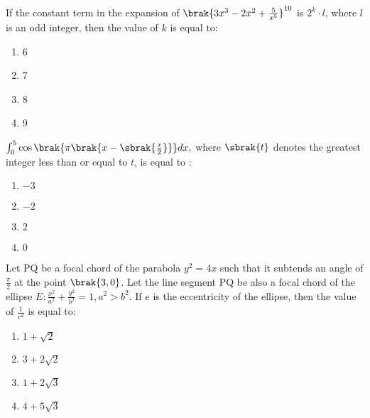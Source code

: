 \iffalse
\title{Assignment}
\author{K.AKSHAY TEJA}
\section{mcq-single}
\fi 
\item If the constant term in the expansion of $\brak{ 3x^3 - 2x^2 + \frac{5}{x^5} }^{10}$ is $2^k \cdot l$, where $l$ is an odd integer, then the value of $k$ is equal to: \hfill {}
\begin{multicols}{4}    
\begin{enumerate}
    \item 6
    \item 7
    \item 8
    \item 9
\end{enumerate}
\end{multicols}

\item $\int_{0}^{5} \cos \brak{\pi \brak{ x - \sbrak{ \frac{x}{2}} } } dx,$ where $\sbrak{ t} $ denotes the greatest integer less than or equal to $t$, is equal to :\hfill {}

\begin{multicols}{4}    
\begin{enumerate}
    \item $-3$
    \item $-2$
    \item $2$
    \item $0$
\end{enumerate}
\end{multicols}

\item Let PQ be a focal chord of the parabola $y^2 = 4x$ such that it subtends an angle of $\frac{\pi}{2}$ at the point $\brak{3, 0}$. Let the line segment PQ be also a focal chord of the ellipse $E: \frac{x^2}{a^2} + \frac{y^2}{b^2} = 1, a^2 > b^2$. If $e$ is the eccentricity of the ellipse, then the value of $\frac{1}{e^2}$ is equal to:\hfill {}

\begin{multicols}{4}
\begin{enumerate}
    \item $1 + \sqrt{2}$
    \item $3 + 2\sqrt{2}$
    \item $1 + 2\sqrt{3}$
    \item $4 + 5\sqrt{3}$
\end{enumerate}
\end{multicols}

